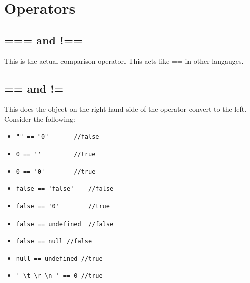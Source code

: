 \documentclass {amsart}
\begin{document}
		
\section{Operators}
	\subsection{=== and !==}
		This is the actual comparison operator.  This acts like == in other langauges.
	\subsection{== and !=}
		This does the object on the right hand side of the operator convert to the left.  
		Consider the following: 

		\begin{itemize}
			\item \begin{lstlisting} 
"" == "0" 		//false
				\end{lstlisting} 

			\item \begin{lstlisting} 
0 == '' 		//true
				\end{lstlisting} 

			\item \begin{lstlisting} 
0 == '0' 		//true
				\end{lstlisting} 
		\end{itemize}


		\begin{itemize}
			\item \begin{lstlisting} 
false == 'false' 	//false 
				\end{lstlisting}

			\item \begin{lstlisting} 
false == '0'	 	//true
				\end{lstlisting} 
		\end{itemize}


		\begin{itemize}
			\item \begin{lstlisting} 
false == undefined 	//false
				\end{lstlisting} 

			\item \begin{lstlisting} 
false == null //false
				\end{lstlisting} 

			\item \begin{lstlisting} 
null == undefined //true
				\end{lstlisting} 

			\item \begin{lstlisting} 
' \t \r \n ' == 0 //true
				\end{lstlisting} 

		\end{itemize}
\end{document}
